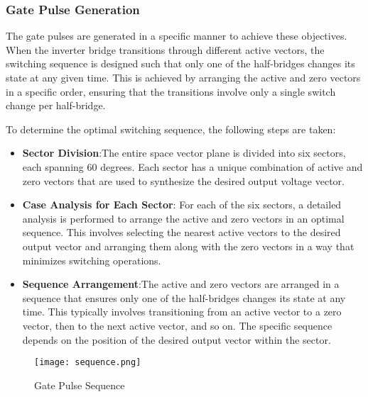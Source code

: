 \subsubsection{Gate Pulse Generation}
The gate pulses are generated in a specific manner to achieve these objectives.
When the inverter bridge transitions through different active vectors, the
switching sequence is designed such that only one of the half-bridges changes
its state at any given time. This is achieved by arranging the active and zero
vectors in a specific order, ensuring that the transitions involve only a
single switch change per half-bridge.

To determine the optimal switching sequence, the following steps are taken:

\begin{itemize}
    \item \textbf{Sector Division}:The entire space vector plane is divided into six sectors, each spanning 60 degrees. Each sector has a unique combination of active and zero vectors that are used to synthesize the desired output voltage vector.
    \item\textbf{Case Analysis for Each Sector}: For each of the six sectors, a detailed analysis is performed to arrange the active and zero vectors in an optimal sequence. This involves selecting the nearest active vectors to the desired output vector and arranging them along with the zero vectors in a way that minimizes switching operations.
    \item \textbf{Sequence Arrangement}:The active and zero vectors are arranged in a sequence that ensures only one of the half-bridges changes its state at any time. This typically involves transitioning from an active vector to a zero vector, then to the next active vector, and so on. The specific sequence depends on the position of the desired output vector within the sector.
\end{itemize}

\begin{figure}[ht]
    \centering
    \texttt{[image: sequence.png]}
    \caption{Gate Pulse Sequence}
    \label{fig:gate_pulse_sequence}
\end{figure}